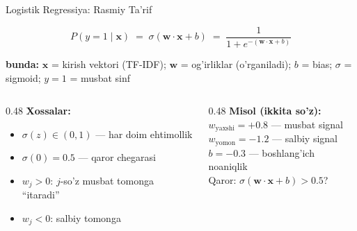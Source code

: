 \documentclass[aspectratio=169,11pt]{beamer}
\newcommand{\bunda}[1]{{\small\textbf{bunda:}\; #1}}
\begin{document}
\begin{frame}{Logistik Regressiya: Rasmiy Ta'rif}
  \begin{tcolorbox}[defbox,title=Ta'rif: LR Bashorat Funksiyasi]
    \[
      P(y{=}1\mid\mathbf{x})
      \;=\;
      \sigma(\mathbf{w}\cdot\mathbf{x}+b)
      \;=\;
      \frac{1}{1+e^{-(\mathbf{w}\cdot\mathbf{x}+b)}}
    \]
  \end{tcolorbox}
  \vspace{3pt}
  \bunda{%
    $\mathbf{x}$ = kirish vektori (TF-IDF);\;
    $\mathbf{w}$ = og'irliklar (o'rganiladi);\;
    $b$ = bias;\;
    $\sigma$ = sigmoid;\;
    $y{=}1$ = musbat sinf%
  }
  \vspace{5pt}
  \begin{columns}[T]
    \begin{column}{0.48\textwidth}
      \small
      \textbf{Xossalar:}
      \begin{itemize}
        \item $\sigma(z)\in(0,1)$ --- har doim ehtimollik
        \item $\sigma(0)=0.5$ --- qaror chegarasi
        \item $w_j>0$: $j$-so'z musbat tomonga ``itaradi''
        \item $w_j<0$: salbiy tomonga
      \end{itemize}
    \end{column}
    \begin{column}{0.48\textwidth}
      \small
      \textbf{Misol (ikkita so'z):}\\[3pt]
      $w_{\text{yaxshi}}=+0.8$ --- musbat signal\\
      $w_{\text{yomon}}=-1.2$ --- salbiy signal\\
      $b=-0.3$ --- boshlang'ich noaniqlik\\[4pt]
      \textcolor{halfgray}{\footnotesize Qaror:
      $\sigma(\mathbf{w}\cdot\mathbf{x}+b)>0.5$?}
    \end{column}
  \end{columns}
\end{frame}
\end{document}
